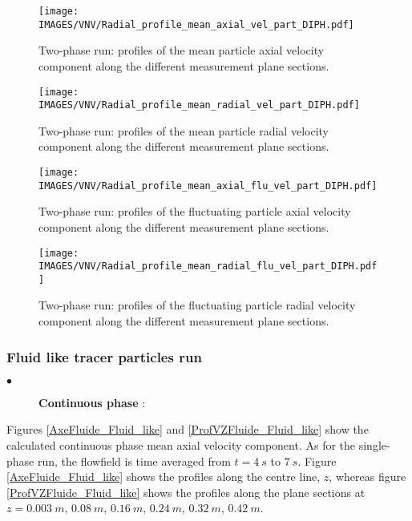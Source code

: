 \noindent

\begin{figure}[H]
   \centerline{\texttt{[image: \\IMAGES/VNV/Radial\_profile\_mean\_axial\_vel\_part\_DIPH.pdf]}}
   \caption{Two-phase run: profiles of the mean particle axial velocity component along the different measurement plane sections.}
   \label{VitZPart}
\end{figure}

\begin{figure}[H]
   \centerline{\texttt{[image: \\IMAGES/VNV/Radial\_profile\_mean\_radial\_vel\_part\_DIPH.pdf]}}
   \caption{Two-phase run: profiles of the mean particle radial velocity component along the different measurement plane sections.}
   \label{VitXPart}
\end{figure}

\begin{figure}[H]
   \centerline{\texttt{[image: \\IMAGES/VNV/Radial\_profile\_mean\_axial\_flu\_vel\_part\_DIPH.pdf]}}
   \caption{Two-phase run: profiles of the fluctuating particle axial velocity component along the different measurement plane sections.}
   \label{VitZpPart}
\end{figure}

\begin{figure}[H]
   \centerline{\texttt{[image: \\IMAGES/VNV/Radial\_profile\_mean\_radial\_flu\_vel\_part\_DIPH.pdf]}}
   \caption{Two-phase run: profiles of the fluctuating particle radial velocity component along the different measurement plane sections.}
   \label{VitXpPart}
\end{figure}

\clearpage

\subsubsection{Fluid like tracer particles run}

\begin{description}
   \item[$\bullet$] \textbf{Continuous phase} :
\end{description}

Figures \ref{AxeFluide_Fluid_like} and \ref{ProfVZFluide_Fluid_like} show the calculated continuous phase mean axial velocity component. As for the single-phase run, the flowfield is time averaged from $t=4~s$ to $7~s$. Figure \ref{AxeFluide_Fluid_like} shows the profiles along the centre line, $z$, whereas figure \ref{ProfVZFluide_Fluid_like} shows the profiles along the plane sections at $z = 0.003~m$, $0.08~m$, $0.16~m$, $0.24~m$, $0.32~m$, $0.42~m$.

